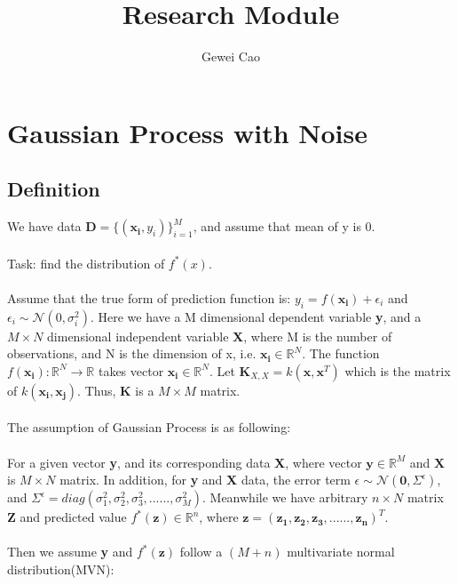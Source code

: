 \documentclass[UTF8]{article}
\title{Research Module}
\author{Gewei Cao}
\begin{document}
\maketitle

\section{Gaussian Process with Noise}
\subsection{Definition}
We have data $\textbf{D} = \{ (\boldsymbol{x_i}, y_i) \} _{i=1} ^{M}$, and assume that mean of y is 0. 
\\ \\
Task: find the distribution of $ f^{*}(x) $.  
\\ \\
Assume that the true form of prediction function is: $y_i = f(\boldsymbol{x_i}) + \epsilon_i$ and $\epsilon_i \sim \mathcal{N}(0,\sigma_{i}^{2})$. Here we have a M dimensional dependent variable \textbf{y}, and a $M \times N$ dimensional independent variable \textbf{X}, where M is the number of observations, and N is the dimension of x, i.e. $\boldsymbol{x_i}\in \mathbb{R}^N $. The function 
$f(\boldsymbol{x_i}) : \mathbb{R}^N \to \mathbb{R}$ takes vector $\boldsymbol{x_i} \in \mathbb{R}^N$. Let $\boldsymbol{K}_{X, X} = k(\boldsymbol{x},\boldsymbol{x}^T)$ which is the matrix of $k(\boldsymbol{x_i}, \boldsymbol{x_j})$. Thus, \textbf{K} is a $M \times M$ matrix. 
\\ \\
The assumption of Gaussian Process is as following: \\ \\
For a given vector \textbf{y}, and its corresponding data \textbf{X}, where vector $ \boldsymbol{y} \in \mathbb{R}^M$ and $\boldsymbol{X}$ is $M \times N$ matrix. In addition, for \textbf{y} and \textbf{X} data, the error term $\epsilon \sim \mathcal{N}(\boldsymbol{0},\varSigma^{\epsilon})$, and $\varSigma^{\epsilon} = diag(\sigma_{1}^{2}, \sigma_{2}^{2}, \sigma_{3}^{2}, ......, \sigma_{M}^{2}) $.  Meanwhile we have arbitrary $n \times N$ matrix \textbf{Z} and predicted value $f^{*}(\boldsymbol{z}) \in \mathbb{R}^n$, where $ \boldsymbol{z} = (\boldsymbol{z_1, z_2, z_3, ......, z_n})^T$. \\ \\
Then we assume \textbf{y} and $f^{*}(\boldsymbol{z})$ follow a $(M + n)$ multivariate normal distribution(MVN): \\
\end{document}
